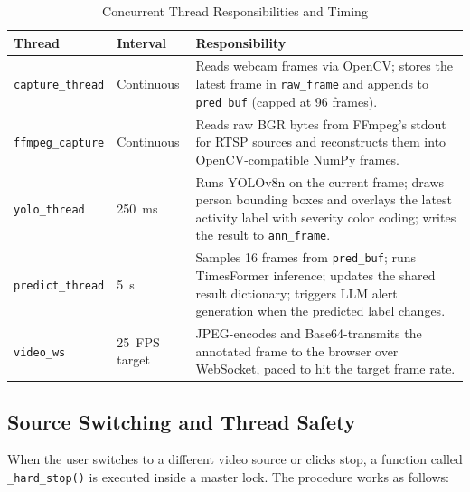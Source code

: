\documentclass[conference]{IEEEtran}
\begin{document}
\begin{table}[htbp]
\caption{Concurrent Thread Responsibilities and Timing}
\label{tab:threads}
\centering
\renewcommand{\arraystretch}{1.25}
\begin{tabular}{|p{2.0cm}|p{1.3cm}|p{4.1cm}|}
\hline
\textbf{Thread} & \textbf{Interval} & \textbf{Responsibility} \\
\hline
\texttt{capture\_thread} & Continuous &
Reads webcam frames via OpenCV; stores the latest frame in
\texttt{raw\_frame} and appends to \texttt{pred\_buf} (capped at
96 frames). \\
\hline
\texttt{ffmpeg\_capture} & Continuous &
Reads raw BGR bytes from FFmpeg's stdout for RTSP sources and
reconstructs them into OpenCV-compatible NumPy frames. \\
\hline
\texttt{yolo\_thread} & 250~ms &
Runs YOLOv8n on the current frame; draws person bounding boxes and
overlays the latest activity label with severity color coding;
writes the result to \texttt{ann\_frame}. \\
\hline
\texttt{predict\_thread} & 5~s &
Samples 16 frames from \texttt{pred\_buf}; runs TimesFormer
inference; updates the shared result dictionary; triggers
LLM alert generation when the predicted label changes. \\
\hline
\texttt{video\_ws} & 25~FPS target &
JPEG-encodes and Base64-transmits the annotated frame to the
browser over WebSocket, paced to hit the target frame rate. \\
\hline
\end{tabular}
\end{table}

\subsection{Source Switching and Thread Safety}

When the user switches to a different video source or clicks stop, a
function called \texttt{\_hard\_stop()} is executed inside a master lock.
The procedure works as follows:
\end{document}
